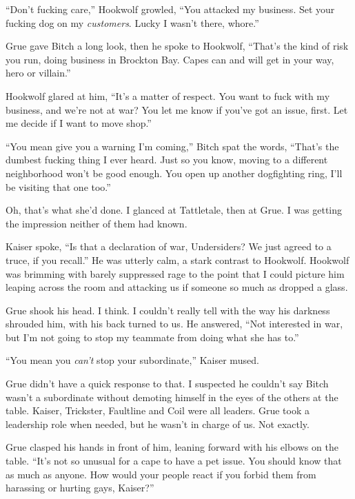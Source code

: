 ``Don't fucking care,'' Hookwolf growled, ``You attacked my business.  Set your fucking dog on my \emph{customers}.  Lucky I wasn't there, whore.''



Grue gave Bitch a long look, then he spoke to Hookwolf, ``That's the kind of risk you run, doing business in Brockton Bay.  Capes can and will get in your way, hero or villain.''



Hookwolf glared at him, ``It's a matter of respect.  You want to fuck with my business, and we're not at war?  You let me know if you've got an issue, first.  Let me decide if I want to move shop.''



``You mean give you a warning I'm coming,'' Bitch spat the words, ``That's the dumbest fucking thing I ever heard.  Just so you know, moving to a different neighborhood won't be good enough.  You open up another dogfighting ring, I'll be visiting that one too.''



Oh, that's what she'd done.  I glanced at Tattletale, then at Grue.  I was getting the impression neither of them had known.



Kaiser spoke, ``Is that a declaration of war, Undersiders?  We just agreed to a truce, if you recall.''  He was utterly calm, a stark contrast to Hookwolf.  Hookwolf was brimming with barely suppressed rage to the point that I could picture him leaping across the room and attacking us if someone so much as dropped a glass.



Grue shook his head.  I think.  I couldn't really tell with the way his darkness shrouded him, with his back turned to us.  He answered, ``Not interested in war, but I'm not going to stop my teammate from doing what she has to.''



``You mean you \emph{can't} stop your subordinate,'' Kaiser mused.



Grue didn't have a quick response to that.  I suspected he couldn't say Bitch wasn't a subordinate without demoting himself in the eyes of the others at the table.  Kaiser, Trickster, Faultline and Coil were all leaders.  Grue took a leadership role when needed, but he wasn't in charge of us.  Not exactly.



Grue clasped his hands in front of him, leaning forward with his elbows on the table. ``It's not so unusual for a cape to have a pet issue.  You should know that as much as anyone.  How would your people react if you forbid them from harassing or hurting gays, Kaiser?''



